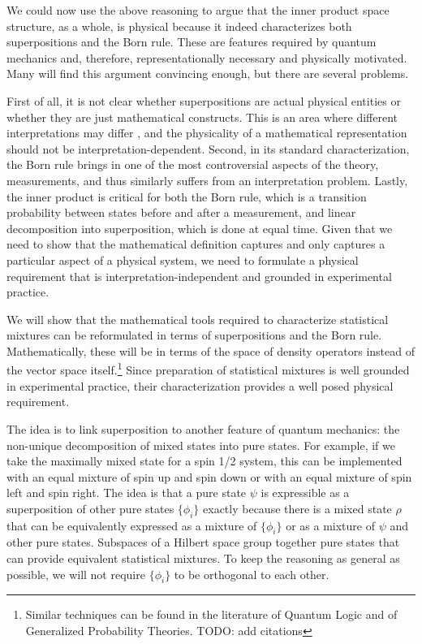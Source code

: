 \documentclass[10pt,twocolumn, nofootinbib]{revtex4-2}
\begin{document}
We could now use the above reasoning to argue that the inner product space structure, as a whole, is physical because it indeed characterizes both superpositions and the Born rule. These are features required by quantum mechanics and, therefore, representationally necessary and physically motivated. Many will find this argument convincing enough, but there are several problems.

First of all, it is not clear whether superpositions are actual physical entities or whether they are just mathematical constructs. This is an area where different interpretations may differ \cite{albert_quantum_1994, wallace_everett_2013, howard_complementarity_2021}, and the physicality of a mathematical representation should not be interpretation-dependent. Second, in its standard characterization, the Born rule brings in one of the most controversial aspects of the theory, measurements, and thus similarly suffers from an interpretation problem. Lastly, the inner product is critical for both the Born rule, which is a transition probability between states before and after a measurement, and linear decomposition into superposition, which is done at equal time. Given that we need to show that the mathematical definition captures and only captures a particular aspect of a physical system, we need to formulate a physical requirement that is interpretation-independent and grounded in experimental practice.

We will show that the mathematical tools required to characterize statistical mixtures can be reformulated in terms of superpositions and the Born rule. Mathematically, these will be in terms of the space of density operators instead of the vector space itself.\footnote{Similar techniques can be found in the literature of Quantum Logic and of Generalized Probability Theories. TODO: add citations} Since preparation of statistical mixtures is well grounded in experimental practice, their characterization provides a well posed physical requirement.

The idea is to link superposition to another feature of quantum mechanics: the non-unique decomposition of mixed states into pure states. For example, if we take the maximally mixed state for a spin 1/2 system, this can be implemented with an equal mixture of spin up and spin down or with an equal mixture of spin left and spin right. The idea is that a pure state $\psi$ is expressible as a superposition of other pure states $\{\phi_i\}$ exactly because there is a mixed state $\rho$ that can be equivalently expressed as a mixture of $\{\phi_i\}$ or as a mixture of $\psi$ and other pure states. Subspaces of a Hilbert space group together pure states that can provide equivalent statistical mixtures. To keep the reasoning as general as possible, we will not require $\{\phi_i\}$ to be orthogonal to each other.
\end{document}
